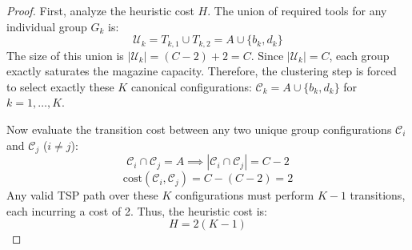 \documentclass[11pt,a4paper]{article}
\theoremstyle{plain}
\theoremstyle{definition}
\newcommand{\JGP}{\text{JGP}}
\begin{document}
\begin{proof}
	First, analyze the heuristic cost $H$. The union of required tools for any individual group $G_k$ is:
	\[ \mathcal{U}_k = T_{k,1} \cup T_{k,2} = A \cup \{b_k, d_k\} \]
	The size of this union is $|\mathcal{U}_k| = (C-2) + 2 = C$. Since $|\mathcal{U}_k| = C$, each group exactly saturates the magazine capacity. Therefore, the \JGP{} clustering step is forced to select exactly these $K$ canonical configurations: $\mathcal{C}_k = A \cup \{b_k, d_k\}$ for $k = 1, \dots, K$.
	
	Now evaluate the transition cost between any two unique group configurations $\mathcal{C}_i$ and $\mathcal{C}_j$ ($i \neq j$):
	\[ \mathcal{C}_i \cap \mathcal{C}_j = A \implies |\mathcal{C}_i \cap \mathcal{C}_j| = C - 2 \]
	\[ \text{cost}(\mathcal{C}_i, \mathcal{C}_j) = C - (C - 2) = 2 \]
	Any valid TSP path over these $K$ configurations must perform $K-1$ transitions, each incurring a cost of 2. Thus, the heuristic cost is:
	\[ H = 2(K-1) \]
	

\end{proof}
\end{document}
